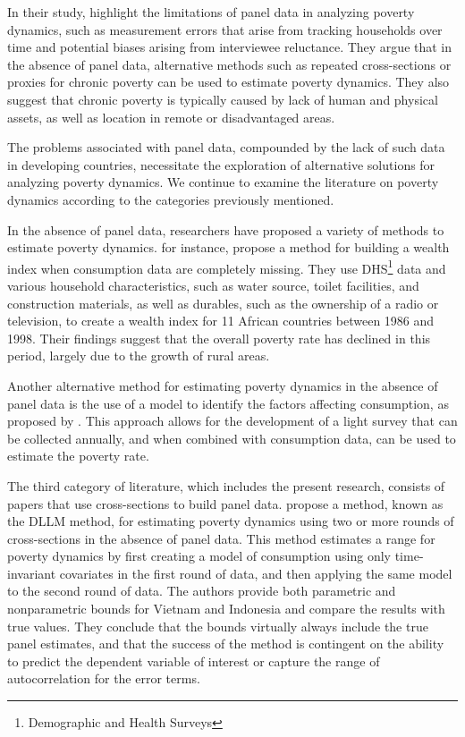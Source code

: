 \documentclass[12pt,a4paper]{article}
\begin{document}
In their study, \cite{lawson2002chronic}
highlight the limitations of panel data in analyzing poverty dynamics, such as measurement errors that arise from tracking households over time and potential biases arising from interviewee reluctance. They argue that in the absence of panel data, alternative methods such as repeated cross-sections or proxies for chronic poverty can be used to estimate poverty dynamics. They also suggest that chronic poverty is typically caused by lack of human and physical assets, as well as location in remote or disadvantaged areas.

The problems associated with panel data, compounded by the lack of such data in developing countries, necessitate the exploration of alternative solutions for analyzing poverty dynamics. We continue to examine the literature on poverty dynamics according to the categories previously mentioned.

In the absence of panel data, researchers have proposed a variety of methods to estimate poverty dynamics. \cite{sahn2000poverty}
for instance, propose a method for building a wealth index when consumption data are completely missing. They use DHS\footnote{Demographic and Health Surveys} data and various household characteristics, such as water source, toilet facilities, and construction materials, as well as durables, such as the ownership of a radio or television, to create a wealth index for 11 African countries between 1986 and 1998. Their findings suggest that the overall poverty rate has declined in this period, largely due to the growth of rural areas.

  Another alternative method for estimating poverty dynamics in the absence of panel data is the use of a model to identify the factors affecting consumption, as proposed by \cite{mathiassen2013testing}. This approach allows for the development of a light survey that can be collected annually, and when combined with consumption data, can be used to estimate the poverty rate.

The third category of literature, which includes the present research, consists of papers that use cross-sections to build panel data. \cite{dang2014using} propose a method, known as the DLLM method, for estimating poverty dynamics using two or more rounds of cross-sections in the absence of panel data. This method estimates a range for poverty dynamics by first creating a model of consumption using only time-invariant covariates in the first round of data, and then applying the same model to the second round of data. The authors provide both parametric and nonparametric bounds for Vietnam and Indonesia and compare the results with true values. They conclude that the bounds virtually always include the true panel estimates, and that the success of the method is contingent on the ability to predict the dependent variable of interest or capture the range of autocorrelation for the error terms.
\end{document}
